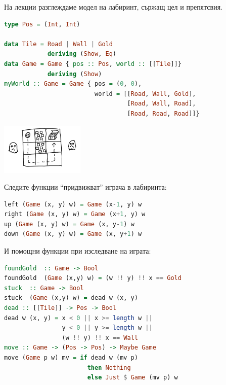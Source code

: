 \begin{mdframed}[hidealllines=true,backgroundcolor=gray!20]
На лекции разглеждаме модел на лабиринт, сържащ цел и препятсвия.
\begin{lstlisting}[basicstyle=\small,language=Haskell]
type Pos = (Int, Int)
  
data Tile = Road | Wall | Gold
            deriving (Show, Eq)  
data Game = Game { pos :: Pos, world :: [[Tile]]}
            deriving (Show)
myWorld :: Game = Game { pos = (0, 0), 
                         world = [[Road, Wall, Gold], 
                                  [Road, Wall, Road], 
                                  [Road, Road, Road]]}
\end{lstlisting}
\begin{center}
	\includegraphics[width=4cm]{images/maze}	
\end{center}

Следите функции ``придвижват'' играча в лабиринта:

\begin{lstlisting}[basicstyle=\small,language=Haskell]
left (Game (x, y) w) = Game (x-1, y) w
right (Game (x, y) w) = Game (x+1, y) w
up (Game (x, y) w) = Game (x, y-1) w
down (Game (x, y) w) = Game (x, y+1) w	
\end{lstlisting}

И помощни функции при изследване на играта:

\begin{lstlisting}[basicstyle=\small,language=Haskell]
foundGold  :: Game -> Bool
foundGold  (Game (x,y) w) = (w !! y) !! x == Gold
stuck  :: Game -> Bool
stuck  (Game (x,y) w) = dead w (x, y)
dead :: [[Tile]] -> Pos -> Bool
dead w (x, y) = x < 0 || x >= length w ||
                y < 0 || y >= length w || 
                (w !! y) !! x == Wall
move :: Game -> (Pos -> Pos) -> Maybe Game
move (Game p w) mv = if dead w (mv p) 
                       then Nothing 
                       else Just $ Game (mv p) w
\end{lstlisting}

\end{mdframed}

